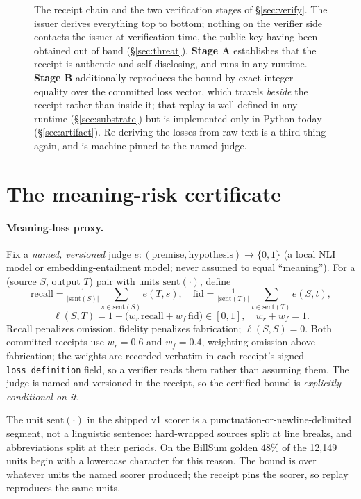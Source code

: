 \documentclass[11pt]{article}
\theoremstyle{definition}
\begin{document}
\begin{figure}[tbp]
\caption{The receipt chain and the two verification stages of
\S\ref{sec:verify}. The issuer derives everything top to bottom; nothing on
the verifier side contacts the issuer at verification time, the public key
having been obtained out of band (\S\ref{sec:threat}). \textbf{Stage A} establishes that the
receipt is authentic and self-disclosing, and runs in any runtime.
\textbf{Stage B} additionally reproduces the bound by exact integer equality
over the committed loss vector, which travels \emph{beside} the receipt rather
than inside it; that replay is well-defined in any runtime
(\S\ref{sec:substrate}) but is implemented only in Python today
(\S\ref{sec:artifact}). Re-deriving the losses from raw text is a third thing
again, and is machine-pinned to the named judge.}
\label{fig:chain}
\end{figure}

\section{The meaning-risk certificate}\label{sec:certificate}

\paragraph{Meaning-loss proxy.}
Fix a \emph{named, versioned} judge
$e:(\text{premise},\text{hypothesis})\to\{0,1\}$ (a local NLI model or
embedding-entailment model; never assumed to equal ``meaning''). For a
(source $S$, output $T$) pair with units $\mathrm{sent}(\cdot)$,
define
\[
\mathrm{recall}=\tfrac{1}{|\mathrm{sent}(S)|}\!\!\sum_{s\in\mathrm{sent}(S)}\!\! e(T,s),\quad
\mathrm{fid}=\tfrac{1}{|\mathrm{sent}(T)|}\!\!\sum_{t\in\mathrm{sent}(T)}\!\! e(S,t),
\]
\[
\ell(S,T)=1-\big(w_r\,\mathrm{recall}+w_f\,\mathrm{fid}\big)\in[0,1],\quad w_r+w_f=1.
\]
Recall penalizes omission, fidelity penalizes fabrication; $\ell(S,S)=0$.
Both committed receipts use $w_r=0.6$ and $w_f=0.4$, weighting omission above
fabrication; the weights are recorded verbatim in each receipt's signed
\texttt{loss\_definition} field, so a verifier reads them rather than
assuming them. The judge is named and versioned in the receipt, so the
certified bound is \emph{explicitly conditional on it}.

The unit $\mathrm{sent}(\cdot)$ in the shipped v1 scorer is a
punctuation-or-newline-delimited segment, not a linguistic sentence:
hard-wrapped sources split at line breaks, and abbreviations split at their
periods. On the BillSum golden 48\% of the 12,149 units begin with a
lowercase character for this reason. The bound is over whatever units the
named scorer produced; the receipt pins the scorer, so replay reproduces the
same units.
\end{document}
